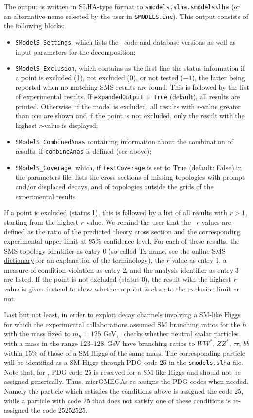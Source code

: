 \documentclass[12pt,a4paper]{article}
\begin{document}
The output is written in SLHA-type format to {\tt smodels.slha.smodelsslha} 
(or an alternative name selected by the user in {\tt SMODELS.inc}).
This output consists of the following blocks: 
\begin{itemize}
\item {\tt SModelS\_Settings}, which lists the \smodels\ code and database versions as well as input parameters for the decomposition; 
\item {\tt SModelS\_Exclusion}, which  
contains as the first line the status information if a point is excluded (1), not excluded (0), or not tested ($-1$), 
the latter being reported when no matching SMS results are found. This is followed by the list of experimental results. 
If {\tt expandedOutput = True} (default), all results are printed. Otherwise, if the model is excluded, all results with $r$-value greater than one are shown and if the point is not excluded, only the result with the highest $r$-value is displayed;
\item {\tt SModelS\_CombinedAnas} containing information about the combination of results, if {\tt combineAnas} is defined (see above);
\item {\tt SModelS\_Coverage}, which,  if \verb|testCoverage| is set to True (default: False) in the parameters file, lists 
the cross sections of missing topologies with prompt and/or displaced decays, and of topologies outside the grids of the experimental results
\end{itemize}

If a point is excluded (status 1), this is followed by a list of all results with $r>1$, starting from the highest $r$-value.  
We remind the user that the \smodels\ $r$-values are defined as the ratio of the predicted theory cross section and the corresponding experimental  upper limit
at 95\% confidence level. 
For each of these results, the SMS topology identifier as entry 0 (so-called Tx-name, see the online \href{https://smodels.github.io/docs/SmsDictionary}{SMS dictionary} 
for an explanation of the terminology), 
the $r$-value as entry 1, a measure of condition violation as entry 2, and the analysis identifier as entry 3 are listed. 
If the point is not excluded (status 0), the result with the highest $r$-value is given instead to show whether a point is close to the exclusion limit or not. 

Last but not least, in order to  exploit decay channels involving a SM-like Higgs for which the experimental collaborations assumed SM branching ratios for the $h$ with the mass fixed to $m_h=125$ GeV, \micro\ checks whether  
neutral scalar particles with a mass in the range 123--128~GeV have branching ratios to $WW^*,\, ZZ^*,\,\tau\tau,\, b\bar{b}$ within 15\% of those of a SM Higgs of the same mass. 
The corresponding particle will be identified as a SM Higgs 
through PDG code 25 in the {\tt smodels.slha} file. 
Note that, for \smodels, PDG code 25 is reserved for a SM-like Higgs and should not be assigned generically.  Thus,  
micrOMEGAs re-assigns the  PDG codes  when needed. Namely  the particle which  satisfies  the conditions above  is assigned the  code 25, while a  particle with  code $25$ that does not satisfy one of these conditions is re-assigned the  code
$25252525$.   
 
\end{document}
